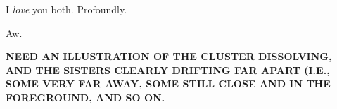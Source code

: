 \documentclass[main.tex]{subfiles}
\begin{document}
\par \Celaeno I \textit{love} you both.  Profoundly.

\par \Alcyone Aw.


\textbf{NEED AN ILLUSTRATION OF THE CLUSTER DISSOLVING, AND THE SISTERS CLEARLY DRIFTING FAR APART (I.E., SOME VERY FAR AWAY, SOME STILL CLOSE AND IN THE FOREGROUND, AND SO ON.}
\end{document}
